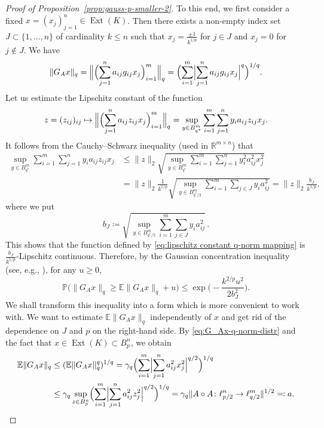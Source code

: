 \documentclass[a4paper]{amsart}
\theoremstyle{definition}
\theoremstyle{remark}
\numberwithin{equation}{section}
\newcommand*{\RR}{\mathbb{R}}
\newcommand*{\EE}{\mathbb{E}}
\newcommand*{\PP}{\mathbb{P}}
\newcommand*{\hadprod}{\mathbin{\circ}} %
\newcommand*{\Ext}{\operatorname{Ext}} %
\begin{document}
\begin{proof}[Proof of Proposition~\ref{prop:gauss-p-smaller-2}]
To this end, we first consider a fixed $x=(x_j)_{j=1}^n \in \Ext(K)$.
Then there exists a non-empty index set $J\subset \{1,\dots,n\}$ of cardinality $k\leq n$ such that $x_j = \frac{\pm 1}{k^{1/p}}$ for $j\in J$ and $x_j=0$ for $j\notin J$. We have
\begin{equation}
\label{eq:G_Ax-q-norm-distr}
\|G_A x\|_q =  \Bigl\|  \Bigl( \sum_{j=1}^n a_{ij}g_{ij} x_j \Bigr)_{i=1}^m  \Bigr\|_q
= \Bigl( \sum_{i=1}^m \Bigl| \sum_{j=1}^n a_{ij}g_{ij} x_j\Bigr|^q\Bigr)^{1/q} .
\end{equation}
Let us estimate the Lipschitz constant of the  function
	\begin{align}\label{eq:lipschitz constant q-norm mapping}
		z=(z_{ij})_{ij} \mapsto \Bigl\|  \Bigl( \sum_{j=1}^n a_{ij}z_{ij} x_j \Bigr)_{i=1}^m  \Bigr\|_q = \sup_{y\in B_{q^*}^m}\sum_{i=1}^m	 \sum_{j=1}^n y_ia_{ij}z_{ij}x_j.
\end{align}
It follows from the Cauchy--Schwarz inequality (used in $\RR^{m\times n}$) that
	\begin{align}	\label{eq:lipschitz} \nonumber
		\sup_{y\in B_{q^*}^m} \sum_{i=1}^m \sum_{j=1}^n y_ia_{ij}z_{ij}x_j
		& \leq \|z\|_2  \sqrt{\sup_{y\in B_{q^*}^m} \sum_{i=1}^m \sum_{j=1}^n y_{i}^2a_{ij}^2x_j^2}
		\\
	    & =\|z\|_2 \frac{1}{k^{1/p}}\sqrt{ \sup_{y\in B^m_{q^*/2}}  \sum_{i=1}^m  \sum_{j\in J} y_i a_{ij}^2  }
    		=  \|z\|_2\frac{ b_J}{k^{1/p}},
	\end{align}
where we put
\[
b_J\coloneqq\sqrt{ \sup_{y\in B^m_{q^*/2}}  \sum_{i=1}^m  \sum_{j\in J} y_i a_{ij}^2   }\,.
\]	
This shows that the function defined by \eqref{eq:lipschitz constant q-norm mapping} is $\frac{ b_J}{k^{1/p}}$-Lipschitz continuous.
Therefore, by the Gaussian concentration inequality (see, e.g., \cite[Chapter~5.1]{Ledoux}), for any $u\geq 0$,
\begin{equation}
\label{eq:G_Ax-q-norm-concentration}
\PP\bigl(\|G_A x\|_q \geq \EE\|G_A x\|_q  + u\bigr) \leq \exp\bigl( - \frac{k^{2/p} u^2}{2b_J^2}\bigr).
\end{equation}
We shall transform this inequality into a form which is more convenient to work with. We want to estimate $\EE \|G_A x\|_q $ independently of $x$
 and get rid of the dependence on $J$ and $p$ on the right-hand side.
By \eqref{eq:G_Ax-q-norm-distr}
and the fact that $x\in\Ext(K)\subset B_p^n$, we obtain
\begin{align*}
\EE \|G_A x\|_q
& \leq (\EE\|G_A x\|_q^q)^{1/q}
= \gamma_q \Bigl( \sum_{i=1}^m \Bigl|\sum_{j=1}^n a_{ij}^2 x_j^2\Bigr|^{q/2}\Bigr)^{1/q}\\
& \leq \gamma_q \sup_{z\in B_p^n} \Bigl( \sum_{i=1}^m \Bigl| \sum_{j=1}^n a_{ij}^2 z_j^2\Bigr|^{q/2}\Bigr)^{1/q}
 =\gamma_q \|A\hadprod A \colon \ell^n_{p/2} \to \ell^m_{q/2}\|^{1/2} \eqqcolon a.
\end{align*}


\end{proof}
\end{document}
